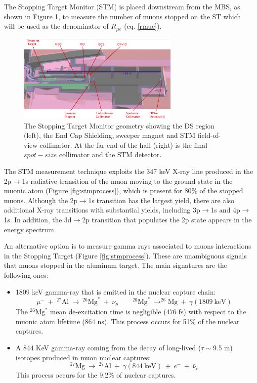 The Stopping Target Monitor (STM) is placed downstream from the MBS, as shown in Figure \ref{fig:stm}, 
to measure the number of muons stopped on the ST which will be used as the denominator of $R_{\mu e}$ (eq. \ref{rmue}).
\begin{figure}[!h]
    \centering
    \includegraphics[width =0.7\textwidth]{figures/png/Screenshot_20240306_180910.png}
    \caption[The Stopping Target Monitor geometry.]{The Stopping Target Monitor geometry showing the DS region (left), 
    the End Cap Shielding, sweeper magnet and STM field-of-view collimator. 
    At the far end of the hall (right) is the final $spot-size$ collimator and the STM detector.}
    \label{fig:stm}
    \end{figure}
    The STM measurement technique exploits the 347 keV X-ray line produced in the 2p$\rightarrow$1s 
    radiative transition of the muon moving to the ground state in the muonic atom (Figure \ref{fig:stmprocess}), 
    which is present for 80\% of the stopped muons. Although the 2p$\rightarrow$1s transition has the 
    largest yield, there are also additional X-ray transitions with substantial yields, 
    including 3p$\rightarrow$1s and 4p$\rightarrow$1s. In addition, the 3d$\rightarrow$2p 
    transition that populates the 2p state appears in the energy spectrum.

    An alternative option is to measure gamma rays associated to muons interactions in the Stopping Target (Figure \ref{fig:stmprocess}).
    These are unambiguous signals that muons stopped in the aluminum target. 
    The main signatures are the following ones: 
    \begin{itemize}
    \item 1809 keV gamma-ray that is emitted in the nuclear capture chain:
    \begin{equation}
        \mu^- \ + \ ^{27}\text{Al} \ \rightarrow \ ^{26}\text{Mg}^* \ + \ \nu_\mu \quad \quad ^{26}\text{Mg}^* \ \rightarrow ^{26}\text{Mg} \ + \ \gamma(1809 \ \text{keV})
     \end{equation}
     The $^{26}\text{Mg}^*$ mean de-excitation time is negligible (476 fs) with 
     respect to the muonic atom lifetime (864 ns). 
     This process occurs for 51\% of the nuclear captures.
     \item  A 844 KeV gamma-ray coming from the decay of 
     long-lived ($\tau \sim$9.5 m) isotopes produced in muon nuclear captures:
     \begin{equation}
        ^{27}\text{Mg} \ \rightarrow \ ^{27}\text{Al} \ + \ \gamma(844 \ \text{keV}) \ + \ e^- \ + \ \bar{\nu}_e
     \end{equation}
     This process occurs for the 9.2\% of nuclear captures.
\end{itemize}

